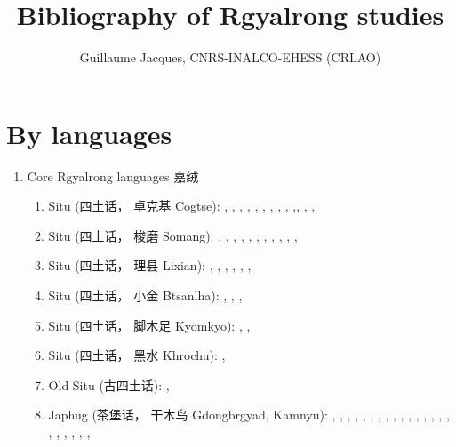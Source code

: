 \documentclass[oldfontcommands,oneside,a4paper,11pt]{article}
\newcommand{\zh}[1]{{\cn #1}}
\newcommand{\langue}[2]{#1}
\begin{document}
  \title{\langue{Bibliography of Rgyalrong studies}{Bibliographie des études rgyalrong}}
 
\author{Guillaume Jacques, CNRS-INALCO-EHESS (CRLAO)}
\maketitle
\sloppy
 
 
\section{\langue{By languages}{Publications classées par langue étudiée}}
\begin{enumerate}
\item \langue{Core Rgyalrong languages \zh{嘉绒}}{Rgyalrong \zh{嘉绒}}
\begin{enumerate}
\item Situ (\zh{四土话， 卓克基} Cogtse): \citet{nagano84}, \citet{linxr93jiarong}, \citet{hsieh99zhuokeji}, \citet{wei01ka}, \citet{lin02dimension}, \citet{huangsun02}, \citet{youjing03zhuokeji}, \citet{nagano03cogtse}, \citet{jacques03s.houzhui}, \citet{jacksonlin07},\citet{lin09phd}, \citet{lin11direction},  \citet{jacques12agreement},
\item Situ (\zh{四土话， 梭磨} Somang): \citet{jin57suomo}, \citet{jin58suomo}, \citet{bauman75}, \citet{delancey81ergativity},  \citet{delancey81direction}, \citet{qu83rencheng}, \citet{dai92suomo}, \citet{linxr93jiarong}, \citet{yanmuchu05houzhui}, \citet{yanmuchu05sa}, \citet{yanmuchu06hechengci}, 
\item Situ (\zh{四土话， 理县} Lixian): \citet{wolfenden36jyarung}, \citet{wen40paslok}, \citet{jin49jyarung}, \citet{chang68gyarung}, \citet{chang75gyarung}, \citet{linxr93jiarong},
\item Situ (\zh{四土话， 小金} Btsanlha): \citet{mansier83tsenla}, \citet{linxr93jiarong}, \citet{btsanlha09dict}, 
\item Situ (\zh{四土话， 脚木足} Kyomkyo): \citet{linxr93jiarong}, \citet{prins11kyomkyo},
\item Situ (\zh{四土话， 黑水} Khrochu): \citet{jackson15sastod},
\item \langue{Old Situ}{Ancien situ} (\zh{古四土话}): \citet{ngagdbang10gtamdpe},
\item Japhug (\zh{茶堡话， 干木鸟} Gdongbrgyad, Kamnyu):  \citet{jacques04redupl},     \citet{jacques04these},   \citet{jacques07passif},  \citet{jacques07redupl}, \citet{jacques08},  \citet{jacques10gesar}, \citet{jacques10refl},  \citet{jacques10inverse},  \citet{jacques12incorp},   \citet{jacques12demotion}, \citet{jacques11kinship}, \citet{jacques12agreement},  \citet{jacques13harmonization},  \citet{jacques13tropative}, \citet{jacques14antipassive}, \citet{japhug14ideophones}, \citet{jacques14inverse}, \citet{jacques14linking}, \citet{jacques14esquisse}, \citet{jacques15spontaneous}, \citet{jacques2012rgy}, \citet{jacques15causative}, 

\end{enumerate}
\end{enumerate}
\end{document}
